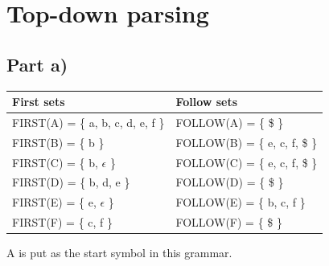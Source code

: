 \documentclass[paper=a4, fontsize=11pt]{scrartcl} %
\numberwithin{equation}{section} %
\numberwithin{figure}{section} %
\numberwithin{table}{section} %
\begin{document}
\section{Top-down parsing}
\subsection{Part a)}
\begin{center}
    \begin{tabular}{ | l | l | }
    \hline
    First sets                              & Follow sets                   \\
    \hline
    FIRST(A) = \{ a, b, c, d, e, f \}       & FOLLOW(A) = \{ \$ \}          \\
    \hline
    FIRST(B) = \{ b \}                      & FOLLOW(B) = \{ e, c, f, \$ \} \\
    \hline
    FIRST(C) = \{ b, $\epsilon$ \}          & FOLLOW(C) = \{ e, c, f, \$ \} \\
    \hline
    FIRST(D) = \{ b, d, e \}                & FOLLOW(D) = \{ \$ \}          \\
    \hline
    FIRST(E) = \{ e, $\epsilon$ \}          & FOLLOW(E) = \{ b, c, f \}     \\
    \hline
    FIRST(F) = \{ c, f \}                   & FOLLOW(F) = \{ \$ \}          \\
    \hline
    \end{tabular}
\end{center}
A is put as the start symbol in this grammar.
\end{document}
